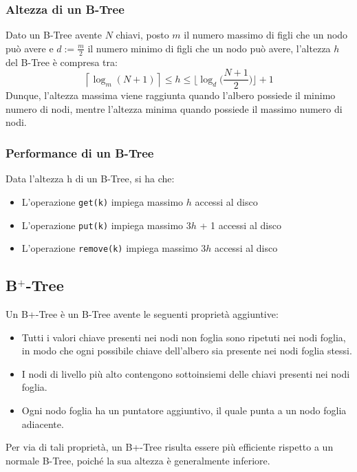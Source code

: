 \documentclass{article}
\begin{document}
\subsubsection{Altezza di un B-Tree}
Dato un B-Tree avente $N$ chiavi, posto $m$ il numero massimo di figli che un nodo può avere e $d := \frac{m}{2}$ il numero minimo di figli che un nodo può avere, l'altezza $h$ del B-Tree è compresa tra:
\[
\left\lceil \log_m(N+1) \right\rceil \leq h \leq \biggl\lfloor \log_d \biggl( \frac{N+1}{2} \biggr) \biggr\rfloor + 1
\]
Dunque, l'altezza massima viene raggiunta quando l'albero possiede il minimo numero di nodi, mentre l'altezza minima quando possiede il massimo numero di nodi.
\subsubsection{Performance di un B-Tree}
Data l'altezza h di un B-Tree, si ha che:
\begin{itemize}
  \item L'operazione \texttt{get(k)} impiega massimo $h$ accessi al disco
  \item L'operazione \texttt{put(k)} impiega massimo 3$h$ + 1 accessi al disco 
  \item L'operazione \texttt{remove(k)} impiega massimo 3$h$ accessi al disco
\end{itemize}

\subsection{B$^+$-Tree}
Un B+-Tree è un B-Tree avente le seguenti proprietà aggiuntive:
\begin{itemize}
    \item Tutti i valori chiave presenti nei nodi non foglia sono ripetuti nei nodi foglia, in modo che ogni possibile chiave dell’albero sia presente nei nodi foglia stessi.
    \item I nodi di livello più alto contengono sottoinsiemi delle chiavi presenti nei nodi foglia.
    \item Ogni nodo foglia ha un puntatore aggiuntivo, il quale punta a un nodo foglia adiacente.
\end{itemize}
Per via di tali proprietà, un B+-Tree risulta essere più efficiente rispetto a un normale B-Tree, poiché la sua altezza è generalmente inferiore.

\end{document}

